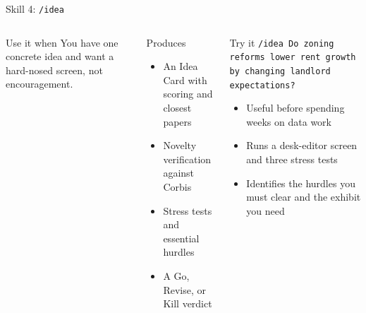\documentclass[aspectratio=169,professionalfonts]{beamer}
\begin{document}
\begin{frame}[t]{Skill 4: \texttt{/idea}}
\small
\begin{columns}[T,onlytextwidth]
\begin{block}{Use it when}
You have one concrete idea and want a hard-nosed screen, not encouragement.
\end{block}
\begin{block}{Produces}
\begin{itemize}
  \item An Idea Card with scoring and closest papers
  \item Novelty verification against Corbis
  \item Stress tests and essential hurdles
  \item A Go, Revise, or Kill verdict
\end{itemize}
\end{block}
\begin{exampleblock}{Try it}
{\small\texttt{/idea Do zoning reforms lower rent growth by changing landlord expectations?}}
\medskip
\begin{itemize}
  \item Useful before spending weeks on data work
  \item Runs a desk-editor screen and three stress tests
  \item Identifies the hurdles you must clear and the exhibit you need
\end{itemize}
\end{exampleblock}
\end{columns}
\end{frame}
\end{document}
